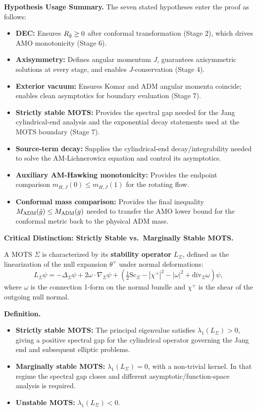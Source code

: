 \textbf{Hypothesis Usage Summary.} The seven stated hypotheses enter the proof as follows:
\begin{itemize}[leftmargin=1.5em, itemsep=2pt]
  \item[\textbf{(H1)}] \textbf{DEC:} Ensures $R_{\tilde{g}} \geq 0$ after conformal transformation (Stage 2), which drives AMO monotonicity (Stage 6).
  \item[\textbf{(H2)}] \textbf{Axisymmetry:} Defines angular momentum $J$, guarantees axisymmetric solutions at every stage, and enables $J$-conservation (Stage 4).
  \item[\textbf{(H3)}] \textbf{Exterior vacuum:} Ensures Komar and ADM angular momenta coincide; enables clean asymptotics for boundary evaluation (Stage 7).
  \item[\textbf{(H4)}] \textbf{Strictly stable MOTS:} Provides the spectral gap needed for the Jang cylindrical-end analysis and the exponential decay statements used at the MOTS boundary (Stage 7).
  \item[\textbf{(H5)}] \textbf{Source-term decay:} Supplies the cylindrical-end decay/integrability needed to solve the AM-Lichnerowicz equation and control its asymptotics.
  \item[\textbf{(H6)}] \textbf{Auxiliary AM-Hawking monotonicity:} Provides the endpoint comparison $m_{H,J}(0)\le m_{H,J}(1)$ for the rotating flow.
  \item[\textbf{(H7)}] \textbf{Conformal mass comparison:} Provides the final inequality $M_{\mathrm{ADM}}(\tilde{g})\le M_{\mathrm{ADM}}(g)$ needed to transfer the AMO lower bound for the conformal metric back to the physical ADM mass.
\end{itemize}
\textbf{Critical Distinction: Strictly Stable vs.\ Marginally Stable MOTS.}

A MOTS $\Sigma$ is characterized by its \textbf{stability operator} $L_\Sigma$, defined as the linearization of the null expansion $\theta^+$ under normal deformations:
\[
L_\Sigma \psi = -\Delta_\Sigma \psi + 2\omega \cdot \nabla_\Sigma \psi + \left(\tfrac{1}{2}\mathrm{Sc}_\Sigma - |\chi^+|^2 - |\omega|^2 + \mathrm{div}_\Sigma \omega\right)\psi,
\]
where $\omega$ is the connection 1-form on the normal bundle and $\chi^+$ is the shear of the outgoing null normal.

\textbf{Definition.}
\begin{itemize}[leftmargin=1.5em]
    \item \textbf{Strictly stable MOTS:} The principal eigenvalue satisfies $\lambda_1(L_\Sigma) > 0$, giving a positive spectral gap for the cylindrical operator governing the Jang end and subsequent elliptic problems.
    \item \textbf{Marginally stable MOTS:} $\lambda_1(L_\Sigma) = 0$, with a non-trivial kernel. In that regime the spectral gap closes and different asymptotic/function-space analysis is required.
    \item \textbf{Unstable MOTS:} $\lambda_1(L_\Sigma) < 0$.
\end{itemize}

